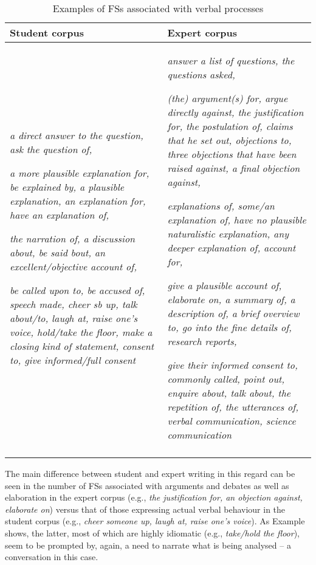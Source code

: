 \documentclass[output=paper]{langscibook}
\begin{document}
\begin{sidewaystable}\small
\begin{tabularx}{\textwidth}{QQ}
\lsptoprule
Student corpus & Expert corpus\\\midrule
\textit{a direct answer to the question, ask the question of,}

\textit{a more plausible explanation for, be explained by, a plausible explanation, an explanation for, have an explanation of,}

\textit{the narration of, a discussion about, be said bout, an excellent/objective account of,}

\textit{be called upon to, be accused of, speech made, cheer sb up, talk about/to, laugh at, raise one’s voice, hold/take the floor, make a closing kind of statement, consent to, give informed/full consent} & \textit{answer a list of questions, the questions asked,}

\textit{(the) argument(s) for, argue directly against, the justification for, the postulation of, claims that he set out, objections to, three objections that have been raised against, a final objection against,}

\textit{explanations of, some/an explanation of, have no plausible naturalistic explanation, any deeper explanation of, account for,}

\textit{give a plausible account of, elaborate on, a summary of, a description of, a brief overview to, go into the fine details of, research reports,}

\textit{give their informed consent to, commonly called, point out, enquire about, talk about, the repetition of, the utterances of, verbal communication, science communication}\\
\lspbottomrule
\end{tabularx}
\caption{Examples of FSs associated with verbal processes\label{tab:wang:7}}
\end{sidewaystable}

The main difference between student and expert writing in this regard can be seen in the number of FSs associated with arguments and debates as well as elaboration in the expert corpus (e.g., \textit{the justification for, an objection against, elaborate on}) versus that of those expressing actual verbal behaviour in the student corpus (e.g., \textit{cheer someone up, laugh at, raise one’s voice}). As Example  shows, the latter, most of which are highly idiomatic (e.g., \textit{take/hold the floor}), seem to be prompted by, again, a need to narrate what is being analysed – a conversation in this case.
\end{document}
